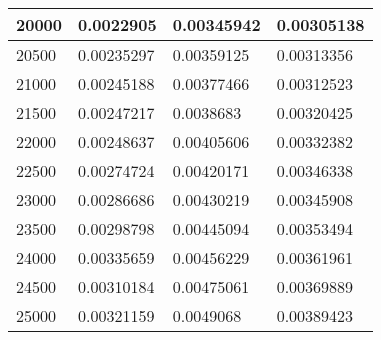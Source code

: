 \documentclass{article}
\begin{document}
\begin{table}[]
\begin{tabular}{|l|l|l|l|}
		20000  &  0.0022905	    &   0.00345942	 &  0.00305138  \\ \hline
		20500  &  0.00235297    & 	0.00359125	 &  0.00313356  \\ \hline
		21000  &  0.00245188    & 	0.00377466	 &  0.00312523  \\ \hline
		21500  &  0.00247217    & 	0.0038683	 &  0.00320425  \\ \hline
		22000  &  0.00248637    & 	0.00405606	 &  0.00332382  \\ \hline
		22500  &  0.00274724    & 	0.00420171	 &  0.00346338  \\ \hline
		23000  &  0.00286686    & 	0.00430219	 &  0.00345908  \\ \hline
		23500  &  0.00298798    & 	0.00445094	 &  0.00353494  \\ \hline
		24000  &  0.00335659    & 	0.00456229	 &  0.00361961  \\ \hline
		24500  &  0.00310184    & 	0.00475061	 &  0.00369889  \\ \hline
		25000  &  0.00321159    & 	0.0049068	 &  0.00389423  \\ \hline
	\end{tabular}
\end{table}
\end{document}
